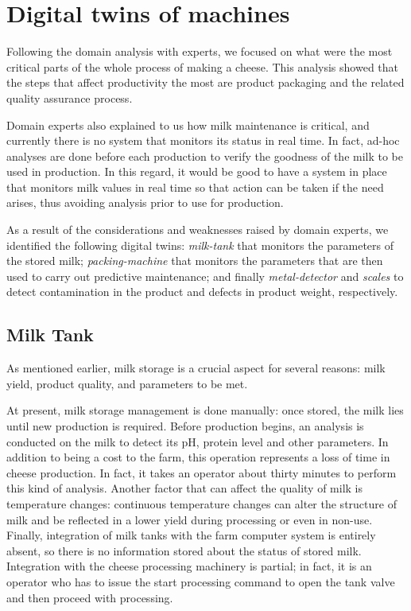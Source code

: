 \section{Digital twins of machines}
Following the domain analysis with experts, we focused on what were the most critical parts of the whole process of making a cheese.
This analysis showed that the steps that affect productivity the most are product packaging and the related quality assurance process.

Domain experts also explained to us how milk maintenance is critical, and currently there is no system that monitors its status in real time.
In fact, ad-hoc analyses are done before each production to verify the goodness of the milk to be used in production.
In this regard, it would be good to have a system in place that monitors milk values in real time so that action can be taken if the need arises,
thus avoiding analysis prior to use for production.

As a result of the considerations and weaknesses raised by domain experts, we identified the following digital twins:
\textit{milk-tank} that monitors the parameters of the stored milk; \textit{packing-machine} that monitors the parameters that are then used to carry
out predictive maintenance; and finally \textit{metal-detector} and \textit{scales} to detect contamination in the product and defects in product weight, respectively.

\subsection{Milk Tank}
As mentioned earlier, milk storage is a crucial aspect for several reasons: milk yield, product quality, and parameters to be met.

At present, milk storage management is done manually: once stored, the milk lies until new production is required.
Before production begins, an analysis is conducted on the milk to detect its pH, protein level and other parameters.
In addition to being a cost to the farm, this operation represents a loss of time in cheese production.
In fact, it takes an operator about thirty minutes to perform this kind of analysis.
Another factor that can affect the quality of milk is temperature changes: continuous temperature changes can alter the structure of milk and be reflected in
a lower yield during processing or even in non-use.
Finally, integration of milk tanks with the farm computer system is entirely absent, so there is no information stored about the status of stored milk.
Integration with the cheese processing machinery is partial; in fact, it is an operator who has to issue the start processing command to open the tank valve
and then proceed with processing.

